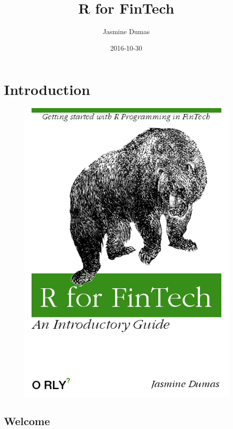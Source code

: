 \documentclass[]{book}
\title{R for FinTech}
\author{Jasmine Dumas}
\date{2016-10-30}
\begin{document}
\maketitle

{
\setcounter{tocdepth}{1}
\tableofcontents
}
\chapter{Introduction}\label{introduction}

\begin{figure}[htbp]
\centering
\includegraphics{cover.png}
\caption{}
\end{figure}

\section{\texorpdfstring{\textbf{Welcome}}{Welcome}}\label{welcome}
\end{document}
